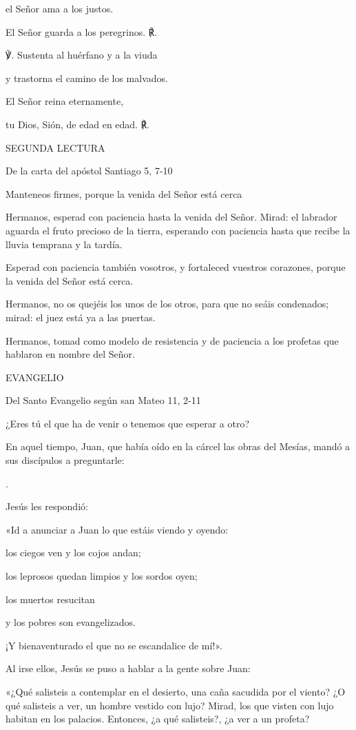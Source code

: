 el Señor ama a los justos.

El Señor guarda a los peregrinos. ℟.

℣. Sustenta al huérfano y a la viuda

y trastorna el camino de los malvados.

El Señor reina eternamente,

tu Dios, Sión, de edad en edad. ℟.

SEGUNDA LECTURA

De la carta del apóstol Santiago 5, 7-10

Manteneos firmes, porque la venida del Señor está cerca

Hermanos, esperad con paciencia hasta la venida del Señor. Mirad: el
labrador aguarda el fruto precioso de la tierra, esperando con paciencia
hasta que recibe la lluvia temprana y la tardía.

Esperad con paciencia también vosotros, y fortaleced vuestros corazones,
porque la venida del Señor está cerca.

Hermanos, no os quejéis los unos de los otros, para que no seáis
condenados; mirad: el juez está ya a las puertas.

Hermanos, tomad como modelo de resistencia y de paciencia a los profetas
que hablaron en nombre del Señor.

EVANGELIO

Del Santo Evangelio según san Mateo 11, 2-11

¿Eres tú el que ha de venir o tenemos que esperar a otro?

En aquel tiempo, Juan, que había oído en la cárcel las obras del Mesías,
mandó a sus discípulos a preguntarle:

.

Jesús les respondió:

«Id a anunciar a Juan lo que estáis viendo y oyendo:

los ciegos ven y los cojos andan;

los leprosos quedan limpios y los sordos oyen;

los muertos resucitan

y los pobres son evangelizados.

¡Y bienaventurado el que no se escandalice de mí!».

Al irse ellos, Jesús se puso a hablar a la gente sobre Juan:

«¿Qué salisteis a contemplar en el desierto, una caña sacudida por el
viento? ¿O qué salisteis a ver, un hombre vestido con lujo? Mirad, los
que visten con lujo habitan en los palacios. Entonces, ¿a qué
salisteis?, ¿a ver a un profeta?

